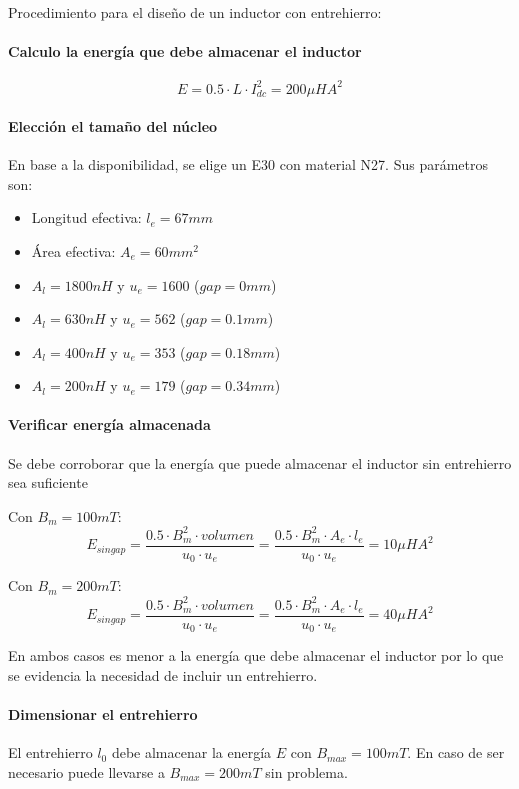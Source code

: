Procedimiento para el diseño de un inductor con entrehierro:

\paragraph{Calculo la energía que debe almacenar el inductor}
$$ E=0.5\cdot L\cdot I_{dc}^2=200\mu HA^2 $$
\paragraph{Elección el tamaño del núcleo}
En base a la disponibilidad, se elige un E30 con material N27. 
Sus parámetros son:
\begin{itemize}
    \item Longitud efectiva: $l_e=67mm$
    \item Área efectiva: $A_e=60{mm}^2$
    \item $A_l=1800nH$ y $u_e=1600$ ($gap=0mm$)
    \item $A_l=630nH$ y $u_e=562$ ($gap=0.1mm$)
    \item $A_l=400nH$ y $u_e=353$ ($gap=0.18mm$)
    \item $A_l=200nH$ y $u_e=179$ ($gap=0.34mm$)
\end{itemize}

\paragraph{Verificar energía almacenada}

Se debe corroborar que la energía que puede almacenar el inductor sin entrehierro sea suficiente

Con $B_m=100mT$:
$$ E_{singap}=\frac{0.5\cdot B_m^2\cdot {volumen}}{u_0\cdot u_e}=\frac{0.5\cdot B_m^2\cdot A_e\cdot l_e}{u_0\cdot u_e}=10\mu HA^2 $$

Con $B_m=200mT$:
$$ E_{singap}=\frac{0.5\cdot B_m^2\cdot {volumen}}{u_0\cdot u_e}=\frac{0.5\cdot B_m^2\cdot A_e\cdot l_e}{u_0\cdot u_e}=40\mu HA^2 $$

En ambos casos es menor a la energía que debe almacenar el inductor por lo que se evidencia la necesidad de incluir un entrehierro. 

\paragraph{Dimensionar el entrehierro}

El entrehierro $l_0$ debe almacenar la energía $E$ con $B_{max}=100mT$.
En caso de ser necesario puede llevarse a $B_{max}=200mT$ sin problema. 


